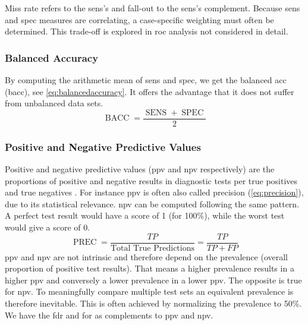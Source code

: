 Miss rate refers to the \acrshort{sens}'s and fall-out to the \acrshort{sens}'s complement. Because \acrshort{sens} and \acrshort{spec} measures are correlating, a case-specific weighting must often be determined. %
This trade-off is explored in \acrfull{roc} analysis not considered in detail. 

\subsubsection{Balanced Accuracy}

By computing the arithmetic mean of \acrshort{sens} and \acrshort{spec}, we get the balanced \acrshort{acc} (\acrshort{bacc}), see \cref{eq:balancedaccuracy}. It offers the advantage that it does not suffer from unbalanced data sets.
\begin{equation}
    \operatorname{BACC} = \frac{\operatorname{SENS} + \operatorname{SPEC}}{2}
    \label{eq:balancedaccuracy}
\end{equation}

\subsubsection{Positive and Negative Predictive Values}

Positive and negative predictive values (\acrshort{ppv} and \acrshort{npv} respectively) are the proportions of positive and negative results in diagnostic tests per true positives and true negatives \cite{Skaik.2008}. For instance \acrshort{ppv} is often also called precision (\cref{eq:precision}), due to its statistical relevance. \acrshort{npv} can be computed following the same pattern. A perfect test result would have a score of 1 (for 100\%), while the worst test would give a score of 0.
\begin{equation}
    \operatorname{PREC} = \frac{TP}{ \text{Total True Predictions}} = \frac{TP}{TP + FP}
    \label{eq:precision}
\end{equation}
\acrshort{ppv} and \acrshort{npv} are not intrinsic and therefore depend on the prevalence (overall proportion of positive test results). That means a higher prevalence results in a higher \acrshort{ppv} and conversely a lower prevalence in a lower \acrshort{ppv}. The opposite is true for \acrshort{npv}. To meaningfully compare multiple test sets an equivalent prevalence is therefore inevitable. This is often achieved by normalizing the prevalence to 50\%. We have the \acrfull{fdr} and \acrfull{for} as complements to \acrshort{ppv} and \acrshort{npv}.

